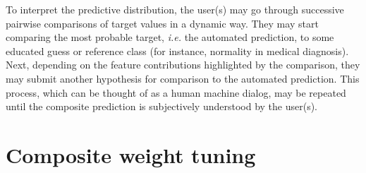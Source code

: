 \documentclass[english]{scrartcl}
\begin{document}

To interpret the predictive distribution, the user(s) may go through successive pairwise comparisons of target values in a dynamic way. They may start comparing the most probable target, {\em i.e.} the automated prediction, to some educated guess or reference class (for instance, normality in medical diagnosis). Next, depending on the feature contributions highlighted by the comparison, they may submit another hypothesis for comparison to the automated prediction. This process, which can be thought of as a human machine dialog, may be repeated until the composite prediction is subjectively understood by the user(s).






\section{Composite weight tuning}
\label{sec:weight_tuning}
\end{document}
